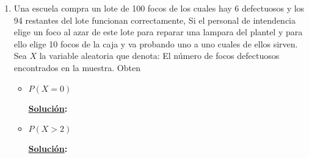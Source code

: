\documentclass[11pt,letterpaper]{report}
\newcommand{\sol}{\textbf{\underline{Solución}: }} %
\begin{document}
\begin{enumerate}
\begin{itemize}
    \item Obtén la función de masa de probabilidad de la Variable Aleatoria $X$
    
    \sol

    \item Calcula $\mathds{E}(X)$ y $Var(X)$
    
    \sol

\end{itemize}

\item Una escuela compra un lote de 100 focos de los cuales hay 6 defectuosos y los 94 restantes del lote funcionan
correctamente, Si el personal de intendencia elige un foco al azar de este lote para reparar una lampara del plantel y
para ello elige 10 focos de la caja y va probando uno a uno cuales de ellos sirven. Sea $X$ la variable aleatoria
que denota: El número de focos defectuosos encontrados en la muestra. Obten

\begin{itemize}
    \item $P(X = 0)$
    
    \sol

    \item $P(X > 2)$
    
    \sol

\end{itemize}
    

\end{enumerate}





\end{document}
